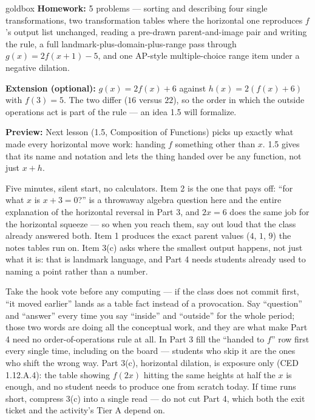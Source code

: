 \documentclass[10pt]{article}
\begin{document}
\begin{skillbox}{goldbox}
\textbf{Homework:} 5 problems --- sorting and describing four single
transformations, two transformation tables where the horizontal one reproduces
$f$'s output list unchanged, reading a pre-drawn parent-and-image pair and
writing the rule, a full landmark-plus-domain-plus-range pass through
$g(x)=2f(x+1)-5$, and one AP-style multiple-choice range item under a negative
dilation.

\textbf{Extension (optional):} $g(x)=2f(x)+6$ against $h(x)=2(f(x)+6)$ with
$f(3)=5$. The two differ ($16$ versus $22$), so the order in which the outside
operations act is part of the rule --- an idea 1.5 will formalize.

\textbf{Preview:} Next lesson (1.5, Composition of Functions) picks up exactly
what made every horizontal move work: handing $f$ something other than $x$.
1.5 gives that its name and notation and lets the thing handed over be any
function, not just $x+h$.
\end{skillbox}

\begin{teachernote}[Warm-Up]
Five minutes, silent start, no calculators. Item 2 is the one that pays off:
``for what $x$ is $x+3=0$?'' is a throwaway algebra question here and the
entire explanation of the horizontal reversal in Part 3, and $2x=6$ does the
same job for the horizontal squeeze --- so when you reach them, say out loud
that the class already answered both. Item 1 produces the exact parent values
($4$, $1$, $9$) the notes tables run on. Item 3(c) asks where the smallest
output happens, not just what it is: that is landmark language, and Part 4
needs students already used to naming a point rather than a number.
\end{teachernote}

\begin{teachernote}
Take the hook vote before any computing --- if the class does not commit
first, ``it moved earlier'' lands as a table fact instead of a provocation.
Say ``question'' and ``answer'' every time you say ``inside'' and ``outside''
for the whole period; those two words are doing all the conceptual work, and
they are what make Part 4 need no order-of-operations rule at all. In Part 3
fill the ``handed to $f$'' row first every single time, including on the board
--- students who skip it are the ones who shift the wrong way. Part 3(c),
horizontal dilation, is exposure only (CED 1.12.A.4): the table showing
$f(2x)$ hitting the same heights at half the $x$ is enough, and no student
needs to produce one from scratch today. If time runs short, compress 3(c)
into a single read --- do not cut Part 4, which both the exit ticket and the
activity's Tier A depend on.
\end{teachernote}
\end{document}
